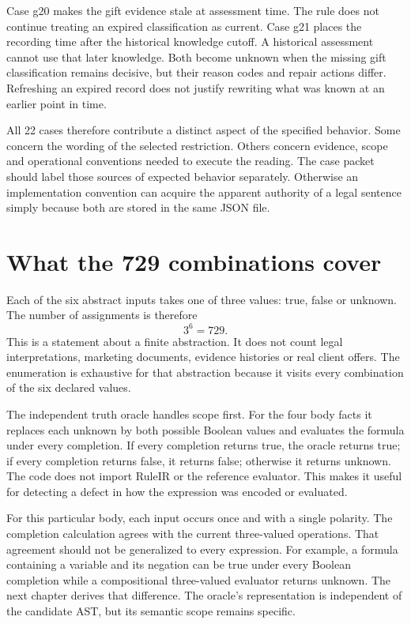 \documentclass[12pt,a4paper,oneside,openany]{book}
\begin{document}
Case g20 makes the gift evidence stale at assessment time. The rule does not
continue treating an expired classification as current. Case g21 places the
recording time after the historical knowledge cutoff. A historical assessment
cannot use that later knowledge. Both become unknown when the missing gift
classification remains decisive, but their reason codes and repair actions
differ. Refreshing an expired record does not justify rewriting what was known
at an earlier point in time.

All 22 cases therefore contribute a distinct aspect of the specified behavior.
Some concern the wording of the selected restriction. Others concern evidence,
scope and operational conventions needed to execute the reading. The case
packet should label those sources of expected behavior separately. Otherwise
an implementation convention can acquire the apparent authority of a legal
sentence simply because both are stored in the same JSON file.

\section{What the 729 combinations cover}
\label{merge:M02:04}

\label{sec:circular-enumeration}
Each of the six abstract inputs takes one of three values: true, false or
unknown. The number of assignments is therefore
\begin{equation}
 3^6=729.
 \label{eq:case-domain-size}
\end{equation}
This is a statement about a finite abstraction. It does not count legal
interpretations, marketing documents, evidence histories or real client offers.
The enumeration is exhaustive for that abstraction because it visits every
combination of the six declared values.

The independent truth oracle handles scope first. For the four body facts it
replaces each unknown by both possible Boolean values and evaluates the formula
under every completion. If every completion returns true, the oracle returns
true; if every completion returns false, it returns false; otherwise it returns
unknown. The code does not import RuleIR or the reference evaluator. This makes
it useful for detecting a defect in how the expression was encoded or evaluated.

For this particular body, each input occurs once and with a single polarity.
The completion calculation agrees with the current three-valued operations.
That agreement should not be generalized to every expression. For example, a
formula containing a variable and its negation can be true under every Boolean
completion while a compositional three-valued evaluator returns unknown. The
next chapter derives that difference. The oracle's representation is independent
of the candidate AST, but its semantic scope remains specific.
\end{document}
